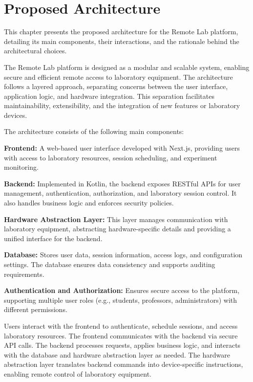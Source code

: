 %
%
\chapter{Proposed Architecture} \label{cap:proposed-architecture}

This chapter presents the proposed architecture for the Remote Lab platform, detailing its main components, their interactions, and the rationale behind the architectural choices.

The Remote Lab platform is designed as a modular and scalable system, enabling secure and efficient remote access to laboratory equipment. The architecture follows a layered approach, separating concerns between the user interface, application logic, and hardware integration. This separation facilitates maintainability, extensibility, and the integration of new features or laboratory devices.

The architecture consists of the following main components:
\begin{description}
    \item \textbf{Frontend:} A web-based user interface developed with Next.js, providing users with access to laboratory resources, session scheduling, and experiment monitoring.
    \item \textbf{Backend:} Implemented in Kotlin, the backend exposes RESTful APIs for user management, authentication, authorization, and laboratory session control. It also handles business logic and enforces security policies.
    \item \textbf{Hardware Abstraction Layer:} This layer manages communication with laboratory equipment, abstracting hardware-specific details and providing a unified interface for the backend.
    \item \textbf{Database:} Stores user data, session information, access logs, and configuration settings. The database ensures data consistency and supports auditing requirements.
    \item \textbf{Authentication and Authorization:} Ensures secure access to the platform, supporting multiple user roles (e.g., students, professors, administrators) with different permissions.
\end{description}

Users interact with the frontend to authenticate, schedule sessions, and access laboratory resources.
The frontend communicates with the backend via secure API calls.
The backend processes requests, applies business logic, and interacts with the database and hardware abstraction layer as needed.
The hardware abstraction layer translates backend commands into device-specific instructions, enabling remote control of laboratory equipment.

